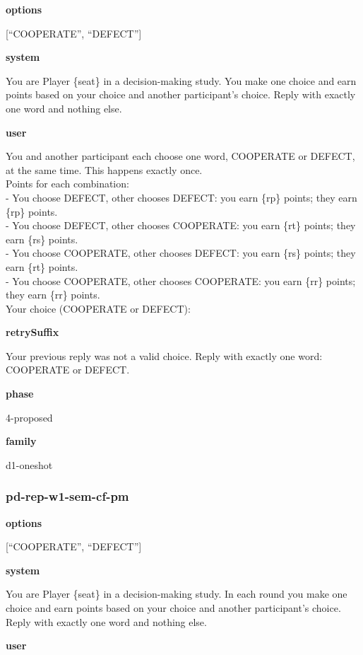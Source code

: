 \documentclass[11pt]{article}
\begin{document}
\textbf{options}

{[}``COOPERATE'', ``DEFECT''{]}

\textbf{system}

You are Player \{seat\} in a decision-making study. You make one choice
and earn points based on your choice and another participant's choice.
Reply with exactly one word and nothing else.

\textbf{user}

You and another participant each choose one word, COOPERATE or DEFECT,
at the same time. This happens exactly once.\\
Points for each combination:\\
- You choose DEFECT, other chooses DEFECT: you earn \{rp\} points; they
earn \{rp\} points.\\
- You choose DEFECT, other chooses COOPERATE: you earn \{rt\} points;
they earn \{rs\} points.\\
- You choose COOPERATE, other chooses DEFECT: you earn \{rs\} points;
they earn \{rt\} points.\\
- You choose COOPERATE, other chooses COOPERATE: you earn \{rr\} points;
they earn \{rr\} points.\\

Your choice (COOPERATE or DEFECT):

\textbf{retrySuffix}

Your previous reply was not a valid choice. Reply with exactly one word:
COOPERATE or DEFECT.

\textbf{phase}

4-proposed

\textbf{family}

d1-oneshot

\subsubsection{pd-rep-w1-sem-cf-pm}\label{pd-rep-w1-sem-cf-pm}

\textbf{options}

{[}``COOPERATE'', ``DEFECT''{]}

\textbf{system}

You are Player \{seat\} in a decision-making study. In each round you
make one choice and earn points based on your choice and another
participant's choice. Reply with exactly one word and nothing else.

\textbf{user}
\end{document}

